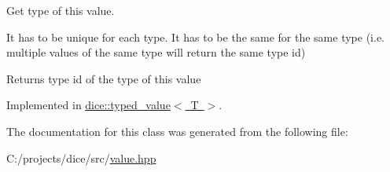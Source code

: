 Get type of this value. 

It has to be unique for each type. It has to be the same for the same type (i.\+e. multiple values of the same type will return the same type id)

\begin{DoxyReturn}{Returns}
type id of the type of this value 
\end{DoxyReturn}


Implemented in \mbox{\hyperlink{classdice_1_1typed__value_aa75a4167e6d3ff2640fd2fa65442e2ed}{dice\+::typed\+\_\+value$<$ T $>$}}.



The documentation for this class was generated from the following file\+:\begin{DoxyCompactItemize}
\item 
C\+:/projects/dice/src/\mbox{\hyperlink{value_8hpp}{value.\+hpp}}\end{DoxyCompactItemize}
